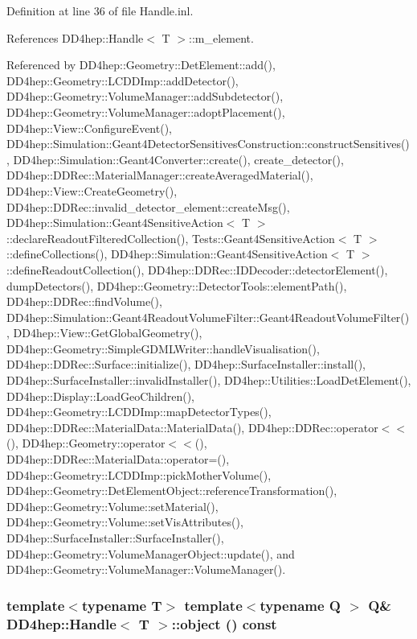Definition at line 36 of file Handle.inl.

References DD4hep::Handle$<$ T $>$::m\_\-element.

Referenced by DD4hep::Geometry::DetElement::add(), DD4hep::Geometry::LCDDImp::addDetector(), DD4hep::Geometry::VolumeManager::addSubdetector(), DD4hep::Geometry::VolumeManager::adoptPlacement(), DD4hep::View::ConfigureEvent(), DD4hep::Simulation::Geant4DetectorSensitivesConstruction::constructSensitives(), DD4hep::Simulation::Geant4Converter::create(), create\_\-detector(), DD4hep::DDRec::MaterialManager::createAveragedMaterial(), DD4hep::View::CreateGeometry(), DD4hep::DDRec::invalid\_\-detector\_\-element::createMsg(), DD4hep::Simulation::Geant4SensitiveAction$<$ T $>$::declareReadoutFilteredCollection(), Tests::Geant4SensitiveAction$<$ T $>$::defineCollections(), DD4hep::Simulation::Geant4SensitiveAction$<$ T $>$::defineReadoutCollection(), DD4hep::DDRec::IDDecoder::detectorElement(), dumpDetectors(), DD4hep::Geometry::DetectorTools::elementPath(), DD4hep::DDRec::findVolume(), DD4hep::Simulation::Geant4ReadoutVolumeFilter::Geant4ReadoutVolumeFilter(), DD4hep::View::GetGlobalGeometry(), DD4hep::Geometry::SimpleGDMLWriter::handleVisualisation(), DD4hep::DDRec::Surface::initialize(), DD4hep::SurfaceInstaller::install(), DD4hep::SurfaceInstaller::invalidInstaller(), DD4hep::Utilities::LoadDetElement(), DD4hep::Display::LoadGeoChildren(), DD4hep::Geometry::LCDDImp::mapDetectorTypes(), DD4hep::DDRec::MaterialData::MaterialData(), DD4hep::DDRec::operator$<$$<$(), DD4hep::Geometry::operator$<$$<$(), DD4hep::DDRec::MaterialData::operator=(), DD4hep::Geometry::LCDDImp::pickMotherVolume(), DD4hep::Geometry::DetElementObject::referenceTransformation(), DD4hep::Geometry::Volume::setMaterial(), DD4hep::Geometry::Volume::setVisAttributes(), DD4hep::SurfaceInstaller::SurfaceInstaller(), DD4hep::Geometry::VolumeManagerObject::update(), and DD4hep::Geometry::VolumeManager::VolumeManager().\hypertarget{class_d_d4hep_1_1_handle_a4e03007979a62db6fa11af123f2b318c}{
\subsubsection[{object}]{\setlength{\rightskip}{0pt plus 5cm}template$<$typename T$>$ template$<$typename Q $>$ Q\& {\bf DD4hep::Handle}$<$ {\bf T} $>$::object () const}}
\label{class_d_d4hep_1_1_handle_a4e03007979a62db6fa11af123f2b318c}


